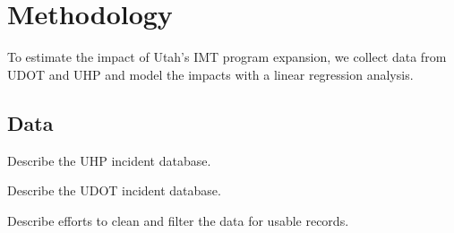 \documentclass[
  letterpaper,
  authoryear]{elsarticle}
\begin{document}

\section{Methodology}\label{methodology}

To estimate the impact of Utah's IMT program expansion, we collect data
from UDOT and UHP and model the impacts with a linear regression
analysis.

\subsection{Data}\label{data}

Describe the UHP incident database.

Describe the UDOT incident database.

Describe efforts to clean and filter the data for usable records.
\end{document}
